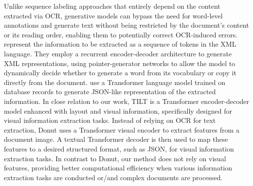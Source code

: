 Unlike sequence labeling approaches that entirely depend on the content extracted via \ac{OCR}, generative models can bypass the need for word-level annotations and generate text without being restricted by the document's content or its reading order, enabling them to potentially correct \ac{OCR}-induced errors. \citet{sage2020end} represent the information to be extracted as a sequence of tokens in the XML language. They employ a recurrent encoder-decoder architecture to generate XML representations, using pointer-generator networks \citep{see2017get} to allow the model to dynamically decide whether to generate a word from its vocabulary or copy it directly from the document. \citet{townsend2021doc2dict} use a Transformer \citep{vaswani2017attention} language model trained on database records to generate JSON-like representation of the extracted information. In close relation to our work, TILT \citet{powalski2021going} is a Transformer encoder-decoder model enhanced with layout and visual information, specifically designed for visual information extraction tasks. Instead of relying on \ac{OCR} for text extraction, Donut \citep{kim2022ocr} uses a Transformer visual encoder to extract features from a document image. A textual Transformer decoder is then used to map these features to a desired structured format, such as JSON, for visual information extraction tasks. In contrast to Donut, our method does not rely on visual features, providing better computational efficiency when various information extraction tasks are conducted or/and complex documents are processed. \\


